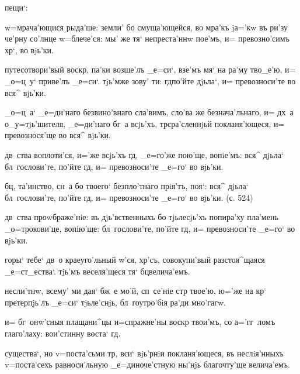 пещи`:

w=мрача'ющися рыда'ше: земли' бо смуща'ющейся, во мра'къ 
jа='кw въ ри'зу че'рну со'лнце w=блече'ся: мы' же тя` 
непреста'ннw пое'мъ, и= превозно'симъ хр`, во вjь'ки.

путесотвори'вый воскр, па'ки возше'лъ _е=си`, взе'мъ 
мя` на ра'му тво_е'ю, и= _о=ц~у` приве'лъ _е=си`. тjь'мже 
зову' ти: гд по'йте дjьла`, и= превозноси'те во вся^ 
вjь'ки.

_о=ц~а` _е=ди'наго безвино'внаго сла'вимъ, сло'ва же 
безнача'льнаго, и= дх~а о_у=тjь'шителя, _е=ди'наго бг~а 
всjь'хъ, тр сра'сленнjьй покланя'ющеся, и= 
превознося'ще во вся^ вjь'ки.


дв~ства воплоти'ся, и='же всjь'хъ гд, _е=го'же пою'ще, 
вопiе'мъ: вся^ дjьла` бл~гослови'те, по'йте гд, и= 
превозноси'те _е=го` во вjь'ки.

бц, та'инство, сн~а бо твоего` безпло'тнаго прiя'тъ, 
поя`: вся^ дjьла` бл~гослови'те, по'йте гд, и= 
превозноси'те _е=го` во вjь'ки. (с. 524)

дв~ства проwбраже'нiе: въ дjь'вственныхъ бо тjьлесjь'хъ 
попира'ху пла'мень _о=трокови'це, вопiю'ще: 
бл~гослови'те, по'йте гд, и= превозноси'те _е=го` во 
вjь'ки.


горы` тебе` дв~о краеуго'льный w'ся, хр'съ, 
совокупи'вый разстоя^щаяся _е=ст_ества`. тjь'мъ 
веселя'щеся тя` бц велича'емъ.

несли'тнw, всему' ми дая` бж~е мо'й, сп~се'нiе стр 
твое'ю, ю='же на кр` претерпjь'лъ _е=си` тjьле'снjь, 
бл~гоутро'бiя ра'ди мно'гагw.

и= бг~онw'сныя плащани^цы и=спражне'ны воскр 
твои'мъ, со а='гг~ломъ глаго'лаху: вои'стинну воста` 
гд.

существа`, но v=поста'сьми тр, вси` вjь'рнiи 
покланя'ющеся, въ неслiя'нныхъ v=поста'сехъ равноси'льную 
_е=диноче'стную ны'нjь благочту'ще велича'емъ.

